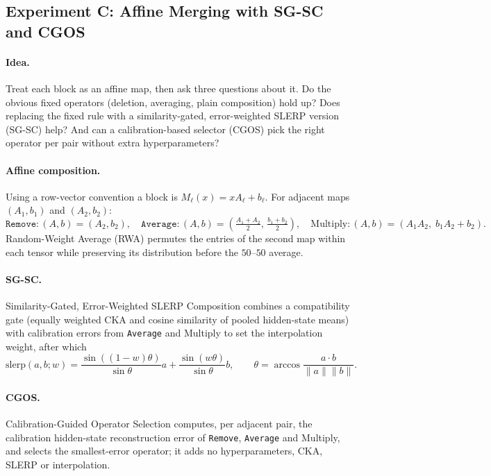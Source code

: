 \documentclass[10pt,a4paper]{article}
\newcommand{\removeop}{\texttt{Remove}}
\newcommand{\averageop}{\texttt{Average}}
\newcommand{\slerp}{\mathrm{slerp}}
\begin{document}
\subsection{Experiment C: Affine Merging with SG-SC and CGOS}
\label{sec:expC}

\paragraph{Idea.} Treat each block as an affine map, then ask three questions
about it. Do the obvious fixed operators (deletion, averaging, plain
composition) hold up? Does replacing the fixed rule with a similarity-gated,
error-weighted SLERP version (SG-SC) help? And can a calibration-based selector
(CGOS) pick the right operator per pair without extra hyperparameters?

\paragraph{Affine composition.} Using a row-vector convention a block is
$M_\ell(x)=x A_\ell + b_\ell$. For adjacent maps $(A_1,b_1)$ and $(A_2,b_2)$:
\begin{equation}
\removeop: (A,b)=(A_2,b_2),\quad
\averageop: (A,b)=\left(\tfrac{A_1+A_2}{2},\,\tfrac{b_1+b_2}{2}\right),\quad
\text{Multiply}: (A,b)=(A_1A_2,\; b_1A_2 + b_2).
\end{equation}
Random-Weight Average (RWA) permutes the entries of the second map within each
tensor while preserving its distribution before the $50$--$50$ average.

\paragraph{SG-SC.} Similarity-Gated, Error-Weighted SLERP Composition combines a
compatibility gate (equally weighted CKA and cosine similarity of pooled
hidden-state means) with calibration errors from \averageop{} and Multiply to set
the interpolation weight, after which
\begin{equation}
\slerp(a,b;w)=\frac{\sin((1-w)\theta)}{\sin\theta}a+\frac{\sin(w\theta)}{\sin\theta}b,
\qquad \theta=\arccos\!\frac{a\cdot b}{\lVert a\rVert\lVert b\rVert}.
\end{equation}

\paragraph{CGOS.} Calibration-Guided Operator Selection computes, per adjacent
pair, the calibration hidden-state reconstruction error of \removeop{},
\averageop{} and Multiply, and selects the smallest-error operator; it adds no
hyperparameters, CKA, SLERP or interpolation.
\end{document}
